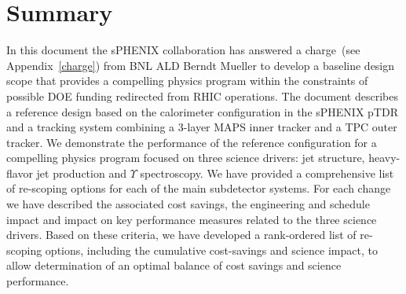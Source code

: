 \section{Summary}

In this document the sPHENIX collaboration has answered a charge~(see
Appendix~\ref{charge}) from BNL ALD Berndt Mueller to develop
a baseline design scope that provides a compelling physics program
within the constraints of possible DOE funding redirected from
RHIC operations. The document describes a reference design based
on the calorimeter configuration in the sPHENIX pTDR and a tracking system
combining a 3-layer MAPS inner tracker and a TPC outer tracker. We
demonstrate the performance of the reference configuration for 
a compelling physics program focused on three science drivers: jet structure,
heavy-flavor jet production and $\Upsilon$ spectroscopy.
We have provided a comprehensive list of re-scoping options for each
of the main subdetector systems. For each change we have 
described the associated
cost savings, the engineering and schedule impact and impact on
key performance measures related to the three science
drivers. Based on these criteria, we have developed a
rank-ordered list of re-scoping options, including the
cumulative cost-savings and science impact, to allow determination
of an optimal balance of cost savings and science performance.
